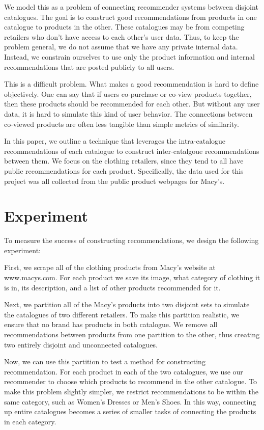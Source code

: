 \documentclass[11pt]{article}
\begin{document}
We model this as a problem of connecting recommender systems between disjoint
catalogues. The goal is to construct good recommendations from products in one
catalogue to products in the other. These catalogues may be from competing 
retailers who don't have access to each other's user data. Thus, to keep the 
problem general, we do not assume that we have any private internal data. 
Instead, we constrain ourselves to use only the product information and internal
recommendations that are posted publicly to all users.

This is a difficult problem. What makes a good recommendation is hard to define
objectively. One can say that if users co-purchase or co-view products together,
then these products should be recommended for each other. But without any user 
data, it is hard to simulate this kind of user behavior. The connections between 
co-viewed products are often less tangible than simple metrics of similarity. 

In this paper, we outline a technique that leverages the intra-catalogue 
recommendations of each catalogue to construct inter-catalgoue recommendations
between them. We focus on the clothing retailers, since they tend to all have
public recommendations for each product. Specifically, the data used for this
project was all collected from the public product webpages for Macy's.

\section*{Experiment}
To measure the success of constructing recommendations, we design the following
experiment:

First, we scrape all of the clothing products from Macy's website at 
www.macys.com. For each product we save its image, what category of clothing it
is in, its description, and a list of other products recommended for it.

Next, we partition all of the Macy's products into two disjoint sets to simulate 
the catalogues of two different retailers. To make this partition realistic, 
we ensure that no brand has products in both catalogue. We remove all 
recommendations between products from one partition to the other, thus creating 
two entirely disjoint and unconnected catalogues.

Now, we can use this partition to test a method for constructing recommendation.
For each product in each of the two catalogues, we use our recommender to choose 
which products to recommend in the other catalogue. To make this problem slightly
simpler, we restrict recommendations to be within the same category, such as
Women's Dresses or Men's Shoes. In this way, connecting up entire catalogues 
becomes a series of smaller tasks of connecting the products in each category.
\end{document}
